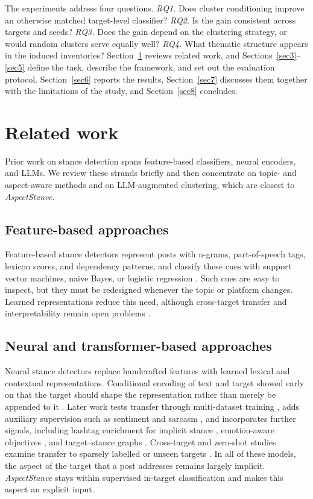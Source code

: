 \documentclass[pdflatex,sn-mathphys-num,iicol]{sn-jnl}%
\begin{document}
The experiments address four questions. \emph{RQ1.} Does cluster conditioning improve an otherwise matched target-level classifier? \emph{RQ2.} Is the gain consistent across targets and seeds? \emph{RQ3.} Does the gain depend on the clustering strategy, or would random clusters serve equally well? \emph{RQ4.} What thematic structure appears in the induced inventories? Section~\ref{sec2} reviews related work, and Sections~\ref{sec3}--\ref{sec5} define the task, describe the framework, and set out the evaluation protocol. Section~\ref{sec6} reports the results, Section~\ref{sec7} discusses them together with the limitations of the study, and Section~\ref{sec8} concludes.

\section{Related work}\label{sec2}

Prior work on stance detection spans feature-based classifiers, neural encoders, and LLMs. We review these strands briefly and then concentrate on topic- and aspect-aware methods and on LLM-augmented clustering, which are closest to \textit{AspectStance}.

\subsection{Feature-based approaches}\label{subsec21}
Feature-based stance detectors represent posts with n-grams, part-of-speech tags, lexicon scores, and dependency patterns, and classify these cues with support vector machines, naive Bayes, or logistic regression \cite{masood2018fake,ayyub2021stance}. Such cues are easy to inspect, but they must be redesigned whenever the topic or platform changes. Learned representations reduce this need, although cross-target transfer and interpretability remain open problems \cite{alturayeif2023systematic,aldayel2021stance}.

\subsection{Neural and transformer-based approaches}\label{subsec22}
Neural stance detectors replace handcrafted features with learned lexical and contextual representations. Conditional encoding of text and target showed early on that the target should shape the representation rather than merely be appended to it \cite{augenstein2016stance}. Later work tests transfer through multi-dataset training \cite{schiller2021stance}, adds auxiliary supervision such as sentiment and sarcasm \cite{alturayeif2023enhancing}, and incorporates further signals, including hashtag enrichment for implicit stance \cite{dong2024implicit}, emotion-aware objectives \cite{pu2025integrating}, and target--stance graphs \cite{cai2025enhancing}. Cross-target and zero-shot studies examine transfer to sparsely labelled or unseen targets \cite{allaway2020zero,khiabani2025cross}. In all of these models, the aspect of the target that a post addresses remains largely implicit. \textit{AspectStance} stays within supervised in-target classification and makes this aspect an explicit input.
\end{document}
